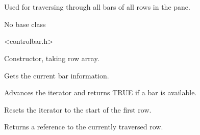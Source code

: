 %
%


\section{}\label{wxbariterator}


Used for traversing through all bars of all rows in the pane.


No base class


<controlbar.h>




\label{wxbariteratorwxbariterator}


Constructor, taking row array.


\label{wxbariteratorbarinfo}


Gets the current bar information.


\label{wxbariteratornext}


Advances the iterator and returns TRUE if a bar is available.


\label{wxbariteratorreset}


Resets the iterator to the start of the first row.


\label{wxbariteratorrowinfo}


Returns a reference to the currently traversed row.

